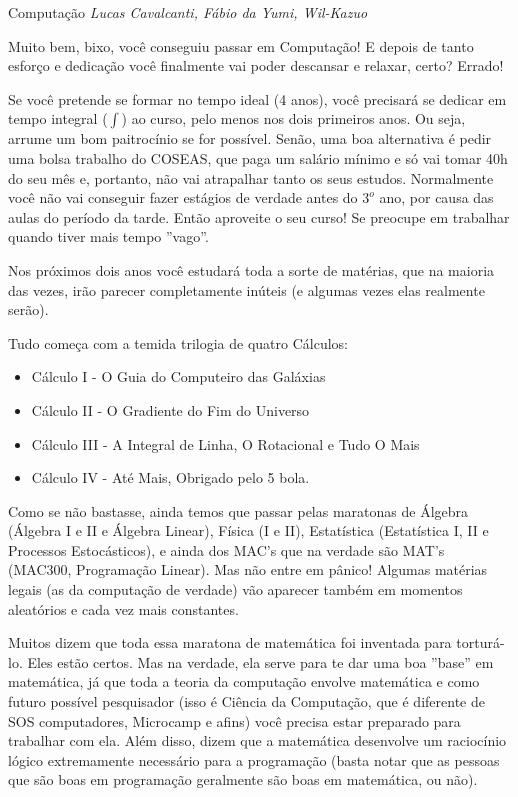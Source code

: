 \begin{subsecao}{Computação}
{\em Lucas Cavalcanti, Fábio da Yumi, Wil-Kazuo}

Muito bem, bixo, você conseguiu passar em Computação! E depois de tanto esforço
e dedicação você finalmente vai poder descansar e relaxar, certo? Errado!

Se você pretende se formar no tempo ideal (4 anos), você precisará se dedicar
em tempo integral ($\int$) ao curso, pelo menos nos dois primeiros anos. Ou
seja, arrume um bom paitrocínio se for possível. Senão, uma boa alternativa é
pedir uma bolsa trabalho do COSEAS, que paga um salário mínimo e só vai
tomar 40h do seu mês e, portanto, não vai atrapalhar tanto os seus estudos.
Normalmente você não vai conseguir fazer estágios de verdade antes do $3^{o}$
ano, por causa das aulas do período da tarde. Então aproveite o seu curso! Se
preocupe em trabalhar quando tiver mais tempo ''vago''.

Nos próximos dois anos você estudará toda a sorte de matérias, que na maioria
das vezes, irão parecer completamente inúteis (e algumas vezes elas realmente
serão).

Tudo começa com a temida trilogia de quatro Cálculos:
\begin{itemize}
\item Cálculo I - O Guia do Computeiro das Galáxias
\item Cálculo II - O Gradiente do Fim do Universo
\item Cálculo III - A Integral de Linha, O Rotacional e Tudo O Mais
\item Cálculo IV - Até Mais, Obrigado pelo 5 bola.
\end{itemize}

Como se não bastasse, ainda temos que passar pelas maratonas
de Álgebra (Álgebra I e II e Álgebra Linear), Física (I e II),
Estatística (Estatística I, II e Processos Estocásticos), e ainda dos MAC's que
na verdade são MAT's (MAC300, Programação Linear). Mas não entre em pânico!
Algumas matérias legais (as da computação de verdade) vão aparecer também em
momentos aleatórios e cada vez mais constantes.

Muitos dizem que toda essa maratona de matemática foi inventada para
torturá-lo. Eles estão certos. Mas na verdade, ela serve para te dar uma
boa ''base'' em matemática, já que toda a teoria da computação envolve
matemática e como futuro possível pesquisador (isso é Ciência da Computação,
que é diferente de SOS computadores, Microcamp e afins) você precisa estar
preparado para trabalhar com ela. Além disso, dizem que a matemática desenvolve
um raciocínio lógico extremamente necessário para a programação (basta notar
que as pessoas que são boas em programação geralmente são boas em matemática,
ou não).


\end{subsecao}
